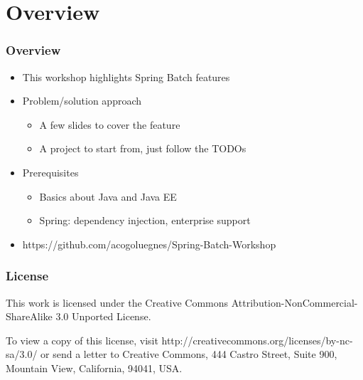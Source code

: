 \section{Overview}

\begin{frame}
\frametitle{Overview}
\begin{itemize}
	\item This workshop highlights Spring Batch features
	\item Problem/solution approach
	\begin{itemize}
		\item A few slides to cover the feature
		\item A project to start from, just follow the TODOs
	\end{itemize}
	\item Prerequisites
	\begin{itemize}
		\item Basics about Java and Java EE
		\item Spring: dependency injection, enterprise support
	\end{itemize}
	\item https://github.com/acogoluegnes/Spring-Batch-Workshop
\end{itemize}

\end{frame}

\begin{frame}
\frametitle{License}

This work is licensed under the Creative Commons Attribution-NonCommercial-ShareAlike 3.0 
Unported License. 

To view a copy of this license, 
visit http://creativecommons.org/licenses/by-nc-sa/3.0/ or 
send a letter to Creative Commons, 444 Castro Street, Suite 900, Mountain View, 
California, 94041, USA.

\end{frame}
